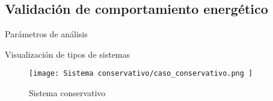 \subsection{Validación de comportamiento energético}
\begin{frame}{Parámetros de análisis}
    \begin{table}[H]%
        \centering
        \begin{center}
        \caption{Parámetros sistema conservativo} 
        \centering
        \end{center}
        \label{ref:TablaC3}
    \end{table}
    \begin{table}[H]
        \centering
        \begin{center}
            \caption{Parámetros sistema no conservativo} 
            \centering
            \end{center}
            \label{tb:C1}
        \end{table}
\end{frame}

\begin{frame}{Visualización de tipos de sistemas}
    \begin{figure}[H]
        \texttt{[image: Sistema conservativo/caso\_conservativo.png ]}
        \centering
        \caption{ Sistema conservativo }
        \label{fig:sistema_conservativo}
    \end{figure}
\end{frame}

